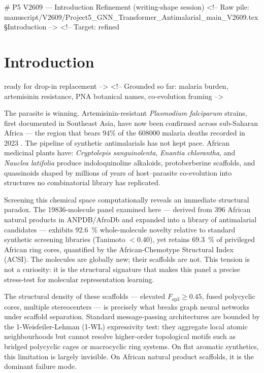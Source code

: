 # P5 V2609 — Introduction Refinement (writing-shape session)
<!-- Raw pile: manuscript/V2609/Project5_GNN_Transformer_Antimalarial_main_V2609.tex §Introduction -->
<!-- Target: refined \section{Introduction} ready for drop-in replacement -->
<!-- Grounded so far: malaria burden, artemisinin resistance, PNA botanical names, co-evolution framing -->

The parasite is winning. Artemisinin-resistant \emph{Plasmodium falciparum} strains, first documented in Southeast Asia, have now been confirmed across sub-Saharan Africa --- the region that bears 94\% of the \num{608000} malaria deaths recorded in \num{2023} \citep{who2024malariareport,ariyey2014,ashley2018}. The pipeline of synthetic antimalarials has not kept pace. African medicinal plants have: \emph{Cryptolepis sanguinolenta}, \emph{Enantia chlorantha}, and \emph{Nauclea latifolia} produce indoloquinoline alkaloids, protoberberine scaffolds, and quassinoids shaped by millions of years of host--parasite co-evolution into structures no combinatorial library has replicated.

Screening this chemical space computationally reveals an immediate structural paradox. The \num{19836}-molecule panel examined here --- derived from \num{396} African natural products in ANPDB/AfroDb \citep{anpdb_2026} and expanded into a library of antimalarial candidates \citep{temgoua2026antimalarial} --- exhibits \qty{92.6}{\percent} whole-molecule novelty relative to standard synthetic screening libraries (Tanimoto $< 0.40$), yet retains \qty{69.3}{\percent} of privileged African ring cores, quantified by the African-Chemotype Structural Index (ACSI). The molecules are globally new; their scaffolds are not. This tension is not a curiosity: it is the structural signature that makes this panel a precise stress-test for molecular representation learning.

The structural density of these scaffolds --- elevated $F_{\mathrm{sp3}} \ge 0.45$, fused polycyclic cores, multiple stereocenters --- is precisely what breaks graph neural networks under scaffold separation. Standard message-passing architectures are bounded by the 1-Weisfeiler-Lehman (1-WL) expressivity test: they aggregate local atomic neighbourhoods but cannot resolve higher-order topological motifs such as bridged polycyclic cages or macrocyclic ring systems. On flat aromatic synthetics, this limitation is largely invisible. On African natural product scaffolds, it is the dominant failure mode.

